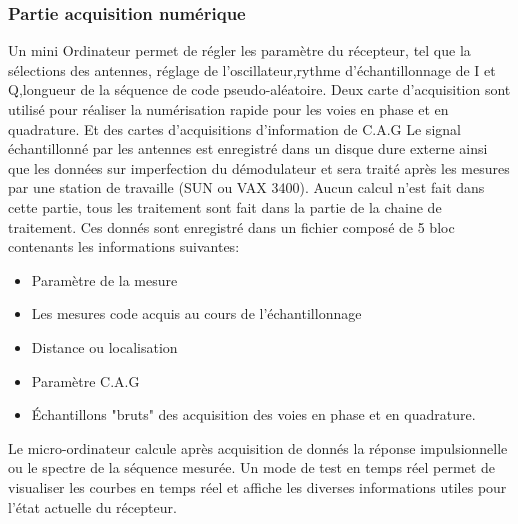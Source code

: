 \subsubsection{Partie acquisition numérique}

Un mini Ordinateur permet de régler les paramètre du récepteur, tel que la sélections des antennes, réglage de l'oscillateur,rythme d'échantillonnage de I et Q,longueur de la séquence de code pseudo-aléatoire.
Deux carte d'acquisition sont utilisé pour réaliser la numérisation rapide pour les voies en phase et en quadrature. Et des cartes d'acquisitions d'information de C.A.G 
Le signal échantillonné par les antennes est enregistré dans un disque dure externe ainsi que les données sur imperfection du démodulateur et sera traité après les mesures par une station de travaille (SUN ou VAX 3400). Aucun calcul n'est fait dans cette partie, tous les traitement sont fait dans la partie de la chaine de traitement.
Ces donnés sont enregistré dans un fichier composé de 5 bloc contenants les informations suivantes:
\begin{itemize}[label=, font=\large \color{lightgray}]
\item Paramètre de la mesure
\item Les mesures code acquis au cours de l'échantillonnage
\item Distance ou localisation
\item Paramètre C.A.G
\item Échantillons "bruts" des acquisition des voies en phase et en quadrature.
\end{itemize}
Le micro-ordinateur calcule après acquisition de donnés la réponse impulsionnelle ou le spectre de la séquence mesurée.
Un mode de test en temps réel permet de visualiser les courbes en temps réel et affiche les diverses informations utiles pour l'état actuelle du récepteur.